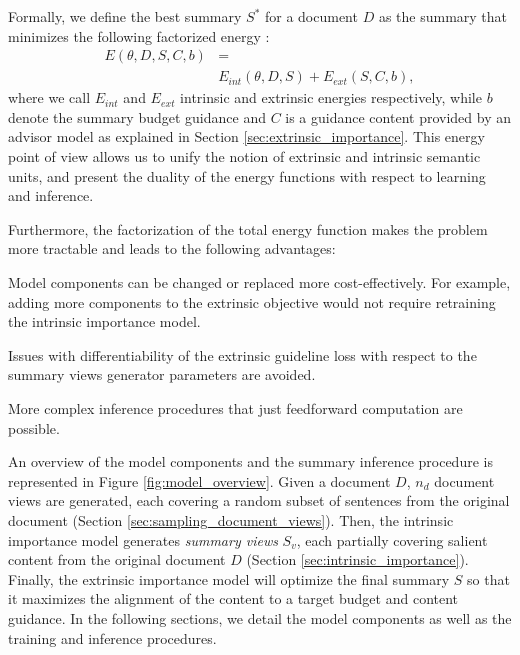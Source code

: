 \documentclass[11pt,table]{article}
\newenvironment{itemizesquish}[2]{\begin{list}{\labelitemi}{\setlength{\itemsep}{#1}\setlength{\labelwidth}{#2}\setlength{\leftmargin}{\labelwidth}\addtolength{\leftmargin}{\labelsep}}}{\end{list}}
\begin{document}
Formally, we define the best summary $S^*$ for a document $D$ as the summary that minimizes the following factorized energy \citep{lecun2006tutorial}:
\begin{align}\label{eq:factorized_energy}
E(\theta, D, S, C, b) &= \\
& E_{int}(\theta, D, S) + E_{ext}(S,C,b), \nonumber
\end{align}
where we call $E_{int}$ and $E_{ext}$ intrinsic and extrinsic energies respectively, while $b$ denote the summary budget guidance and $C$ is a guidance content provided by an advisor model as explained in Section \ref{sec:extrinsic_importance}. 
This energy point of view allows us to unify the notion of extrinsic and intrinsic semantic units, and present the duality of the energy functions with respect to learning and inference.

Furthermore, the factorization of the total energy function makes the problem more tractable and leads to the following advantages:
\begin{itemizesquish}{-0.3em}{0.5em}
    \item Model components can be changed or replaced more cost-effectively. For example, adding more components to the extrinsic objective would not require retraining the intrinsic importance model.
    \item Issues with differentiability of the extrinsic guideline loss with respect to the summary views generator parameters are avoided.
    \item More complex inference procedures that just feedforward computation are possible.
\end{itemizesquish}

An overview of the model components and the summary inference procedure is represented in Figure \ref{fig:model_overview}. Given a document $D$, $n_d$ document views are generated, each covering a random subset of sentences from the original document (Section \ref{sec:sampling_document_views}). Then, the intrinsic importance model generates \emph{summary views} $S_v$, each partially covering salient content from the original document $D$ (Section \ref{sec:intrinsic_importance}). Finally, the extrinsic importance model will optimize the final summary $S$ so that it maximizes the alignment of the content to a target budget and content guidance. In the following sections, we detail the model components as well as the training and inference procedures.
\end{document}
